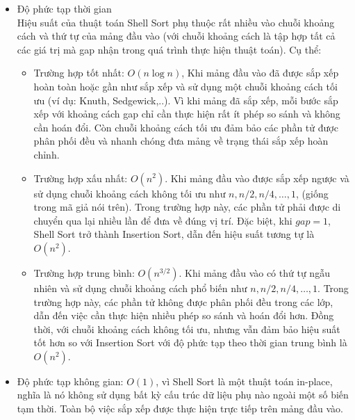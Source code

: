 \begin{itemize}
    \item Độ phức tạp thời gian \cite[p.~83--91]{knuth1998}\\
    Hiệu suất của thuật toán Shell Sort phụ thuộc rất nhiều vào chuỗi 
    khoảng cách và thứ tự của mảng đầu vào (với chuỗi khoảng cách là tập 
    hợp tất cả các giá trị mà gap nhận trong quá trình thực hiện thuật 
    toán). Cụ thể:
    \begin{itemize}[label=$\circ$]
        \item Trường hợp tốt nhất: $O\left(n\log{n}\right)$, Khi mảng đầu vào 
        đã được sắp xếp hoàn toàn hoặc gần như sắp xếp và sử dụng một chuỗi 
        khoảng cách tối ưu (ví dụ: Knuth, Sedgewick,..). Vì khi mảng đã sắp 
        xếp, mỗi bước sắp xếp với khoảng cách gap chỉ cần thực hiện rất ít 
        phép so sánh và không cần hoán đổi. Còn chuỗi khoảng cách tối ưu đảm 
        bảo các phần tử được phân phối đều và nhanh chóng đưa mảng về trạng 
        thái sắp xếp hoàn chỉnh.

        \pagebreak

        \item Trường hợp xấu nhất: $O\left(n^2\right)$. Khi mảng đầu vào được 
        sắp xếp ngược và sử dụng chuỗi khoảng cách không tối ưu như $n,n/2,n/4,
        \ldots,1$, (giống trong mã giả nói trên). Trong trường hợp này, các 
        phần tử phải được di chuyển qua lại nhiều lần để đưa về đúng vị trí. 
        Đặc biệt, khi $gap = 1$, Shell Sort trở thành Insertion Sort, dẫn đến 
        hiệu suất tương tự là $O\left(n^2\right)$.
        \item Trường hợp trung bình: $O\left(n^{3/2}\right)$. Khi mảng đầu vào 
        có thứ tự ngẫu nhiên và sử dụng chuỗi khoảng cách phổ biến như $n,n/2,
        n/4,\ldots,1$. Trong trường hợp này, các phần tử không được phân phối 
        đều trong các lớp, dẫn đến việc cần thực hiện nhiều phép so sánh và 
        hoán đổi hơn. Đồng thời, với chuỗi khoảng cách không tối ưu, nhưng vẫn 
        đảm bảo hiệu suất tốt hơn so với Insertion Sort với độ phức tạp theo 
        thời gian trung bình là $O\left(n^2\right)$.
    \end{itemize}
    
    \item Độ phức tạp không gian: $O\left(1\right)$, vì Shell Sort là một 
    thuật toán in-place, nghĩa là nó không sử dụng bất kỳ cấu trúc dữ liệu 
    phụ nào ngoài một số biến tạm thời. Toàn bộ việc sắp xếp được thực hiện 
    trực tiếp trên mảng đầu vào. 
\end{itemize}